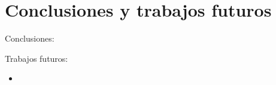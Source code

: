 \chapter{Conclusiones y trabajos futuros}

Conclusiones:

\newpage

Trabajos futuros:

\begin{itemize}
	\item 
\end{itemize}
